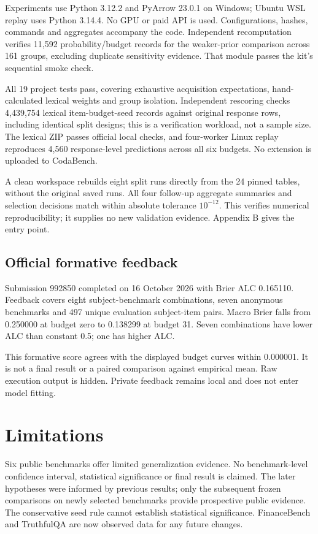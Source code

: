 \documentclass{article}
\begin{document}
Experiments use Python 3.12.2 and PyArrow 23.0.1 on Windows; Ubuntu WSL replay uses Python 3.14.4. No GPU or paid API is used. Configurations, hashes, commands and aggregates accompany the code. Independent recomputation verifies 11,592 probability/budget records for the weaker-prior comparison across 161 groups, excluding duplicate sensitivity evidence. That module passes the kit's sequential smoke check.

All 19 project tests pass, covering exhaustive acquisition expectations, hand-calculated lexical weights and group isolation. Independent rescoring checks 4,439,754 lexical item-budget-seed records against original response rows, including identical split designs; this is a verification workload, not a sample size. The lexical ZIP passes official local checks, and four-worker Linux replay reproduces 4,560 response-level predictions across all six budgets. No extension is uploaded to CodaBench.

A clean workspace rebuilds eight split runs directly from the 24 pinned tables, without the original saved runs. All four follow-up aggregate summaries and selection decisions match within absolute tolerance \(10^{-12}\). This verifies numerical reproducibility; it supplies no new validation evidence. Appendix B gives the entry point.

\clearpage
\subsection{Official formative feedback}\label{official-formative-feedback}

Submission 992850 completed on 16 October 2026 with Brier ALC 0.165110. Feedback covers eight subject-benchmark combinations, seven anonymous benchmarks and 497 unique evaluation subject-item pairs. Macro Brier falls from 0.250000 at budget zero to 0.138299 at budget 31. Seven combinations have lower ALC than constant 0.5; one has higher ALC.

This formative score agrees with the displayed budget curves within 0.000001. It is not a final result or a paired comparison against empirical mean. Raw execution output is hidden. Private feedback remains local and does not enter model fitting.

\section{Limitations}\label{limitations}

Six public benchmarks offer limited generalization evidence. No benchmark-level confidence interval, statistical significance or final result is claimed. The later hypotheses were informed by previous results; only the subsequent frozen comparisons on newly selected benchmarks provide prospective public evidence. The conservative seed rule cannot establish statistical significance. FinanceBench and TruthfulQA are now observed data for any future changes.
\end{document}
